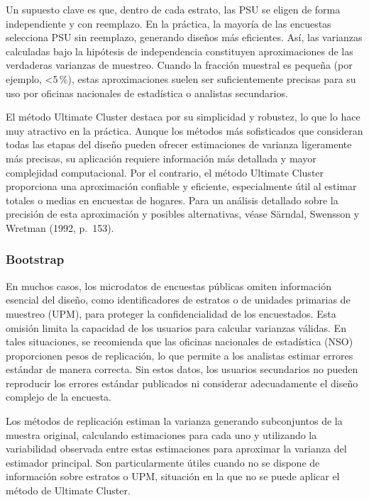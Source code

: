 \documentclass[
  12pt,
]{book}
\begin{document}
Un supuesto clave es que, dentro de cada estrato, las PSU se eligen de forma independiente y con reemplazo. En la práctica, la mayoría de las encuestas selecciona PSU sin reemplazo, generando diseños más eficientes. Así, las varianzas calculadas bajo la hipótesis de independencia constituyen aproximaciones de las verdaderas varianzas de muestreo. Cuando la fracción muestral es pequeña (por ejemplo, \textless5\,\%), estas aproximaciones suelen ser suficientemente precisas para su uso por oficinas nacionales de estadística o analistas secundarios.

El método Ultimate Cluster destaca por su simplicidad y robustez, lo que lo hace muy atractivo en la práctica. Aunque los métodos más sofisticados que consideran todas las etapas del diseño pueden ofrecer estimaciones de varianza ligeramente más precisas, su aplicación requiere información más detallada y mayor complejidad computacional. Por el contrario, el método Ultimate Cluster proporciona una aproximación confiable y eficiente, especialmente útil al estimar totales o medias en encuestas de hogares. Para un análisis detallado sobre la precisión de esta aproximación y posibles alternativas, véase Särndal, Swensson y Wretman (1992, p.~153).

\subsubsection*{Bootstrap}\label{bootstrap}

En muchos casos, los microdatos de encuestas públicas omiten información esencial del diseño, como identificadores de estratos o de unidades primarias de muestreo (UPM), para proteger la confidencialidad de los encuestados. Esta omisión limita la capacidad de los usuarios para calcular varianzas válidas. En tales situaciones, se recomienda que las oficinas nacionales de estadística (NSO) proporcionen pesos de replicación, lo que permite a los analistas estimar errores estándar de manera correcta. Sin estos datos, los usuarios secundarios no pueden reproducir los errores estándar publicados ni considerar adecuadamente el diseño complejo de la encuesta.

Los métodos de replicación estiman la varianza generando subconjuntos de la muestra original, calculando estimaciones para cada uno y utilizando la variabilidad observada entre estas estimaciones para aproximar la varianza del estimador principal. Son particularmente útiles cuando no se dispone de información sobre estratos o UPM, situación en la que no se puede aplicar el método de Ultimate Cluster.
\end{document}
